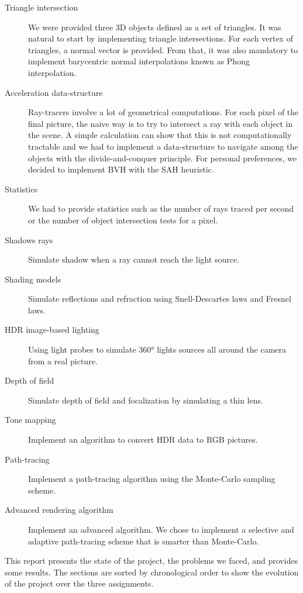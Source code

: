 \documentclass[acmsmall]{acmart}
\begin{document}
\begin{description}
\item[Triangle intersection] We were provided three 3D objects defined as a set of triangles. It was natural to start by implementing triangle intersections. For each vertex of triangles,
a normal vector is provided. From that, it was also mandatory to implement barycentric normal interpolations known as Phong interpolation.
\item[Acceleration data-structure] Ray-tracers involve a lot of geometrical computations. For each pixel of the final picture, the naive way is to try to intersect a ray with each object in the scene.
A simple calculation can show that this is not computationally tractable and we had to implement a data-structure to navigate among the objects with the divide-and-conquer principle.
For personal preferences, we decided to implement BVH with the SAH heuristic.
\item[Statistics] We had to provide statistics such as the number of rays traced per second or the number of object intersection tests for a pixel.

\item[Shadows rays] Simulate shadow when a ray cannot reach the light source.
\item[Shading models] Simulate reflections and refraction using Snell-Descartes laws and Fresnel laws.
\item[HDR image-based lighting] Using light probes to simulate 360\si{\degree} lights sources all around the camera from a real picture.

\item[Depth of field] Simulate depth of field and focalization by simulating a thin lens.
\item[Tone mapping] Implement an algorithm to convert HDR data to RGB pictures.

\item[Path-tracing] Implement a path-tracing algorithm using the Monte-Carlo sampling scheme.
\item[Advanced rendering algorithm] Implement an advanced algorithm. We chose to implement a selective and adaptive path-tracing scheme that is smarter than Monte-Carlo.
\end{description}

This report presents the state of the project, the problems we faced, and provides some results.
The sections are sorted by chronological order to show the evolution of the project over the three assignments.
\end{document}

